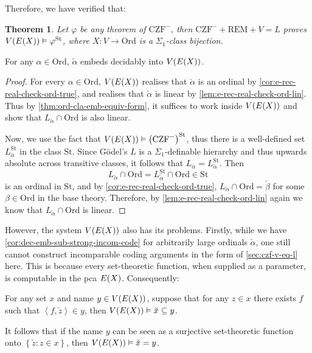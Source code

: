 \documentclass[12pt,openany]{book}
\theoremstyle{plain}
\newtheorem{theorem}{Theorem}[section]
\theoremstyle{definition}
\newcommand\tuple[1]{\left\langle #1 \right\rangle}
\newcommand\CZF{\mathrm{CZF}}
\newcommand\REM{\mathrm{REM}}
\newcommand\Ord{\mathrm{Ord}}
\newcommand\St{\mathrm{St}}
\begin{document}
Therefore, we have verified that:
\begin{theorem}
  \label{thm:e-rec-st-model-czf}
  Let $\varphi$ be any theorem of $\CZF^-$, then $\CZF^- + \REM + V = L$ proves $V\mleft(E\mleft(X\mright)\mright) \vDash \varphi^\St$, where $X : V \rightarrow \Ord$ is a $\Sigma_1$-class bijection.
\end{theorem}

\begin{corollary}[$\CZF^- + \REM + V = L$]
  For any $\alpha \in \Ord$, $\check{\alpha}$ embeds decidably into $V\mleft(E\mleft(X\mright)\mright)$.
\end{corollary}

\begin{proof}
  For every $\alpha \in \Ord$, $V\mleft(E\mleft(X\mright)\mright)$ realises that $\check{\alpha}$ is an ordinal by \autoref{cor:e-rec-real-check-ord-true}, and realises that $\check{\alpha}$ is linear by \autoref{lem:e-rec-real-check-ord-lin}. Thus by \autoref{thm:ord-cla-emb-equiv-form}, it suffices to work inside $V\mleft(E\mleft(X\mright)\mright)$ and show that $L_{\check{\alpha}} \cap \Ord$ is also linear.

  Now, we use the fact that $V\mleft(E\mleft(X\mright)\mright) \vDash \left(\CZF^-\right)^\St$, thus there is a well-defined set $L_{\check{\alpha}}^\St$ in the class $\St$. Since G\"odel's $L$ is a $\Sigma_1$-definable hierarchy and thus upwards absolute across transitive classes, it follows that $L_{\check{\alpha}} = L_{\check{\alpha}}^\St$. Then
  \[L_{\check{\alpha}} \cap \Ord = L_{\check{\alpha}}^\St \cap \Ord \in \St\]
  is an ordinal in $\St$, and by \autoref{cor:e-rec-real-check-ord-true}, $L_{\check{\alpha}} \cap \Ord = \check{\beta}$ for some $\beta \in \Ord$ in the base theory. Therefore, by \autoref{lem:e-rec-real-check-ord-lin} again we know that $L_{\check{\alpha}} \cap \Ord$ is linear.
\end{proof}

However, the system $V\mleft(E\mleft(X\mright)\mright)$ also has its problems. Firstly, while we have \autoref{cor:dec-emb-sub-strong-incom-code} for arbitrarily large ordinals $\check{\alpha}$, one still cannot construct incomparable coding arguments in the form of \autoref{sec:czf-v-eq-l} here. This is because every set-theoretic function, when supplied as a parameter, is computable in the pca $E\mleft(X\mright)$. Consequently:
\begin{lemma}[$\CZF^- + \REM + V = L$]
  \label{lem:e-rec-real-inv-name-eq}
  For any set $x$ and name $y \in V\mleft(E\mleft(X\mright)\mright)$, suppose that for any $z \in x$ there exists $f$ such that $\tuple{f, \check{z}} \in y$, then $V\mleft(E\mleft(X\mright)\mright) \vDash \check{x} \subseteq y$.

  It follows that if the name $y$ can be seen as a surjective set-theoretic function onto $\left\{\check{z} : z \in x\right\}$, then $V\mleft(E\mleft(X\mright)\mright) \vDash \check{x} = y$.
\end{lemma}
\end{document}
